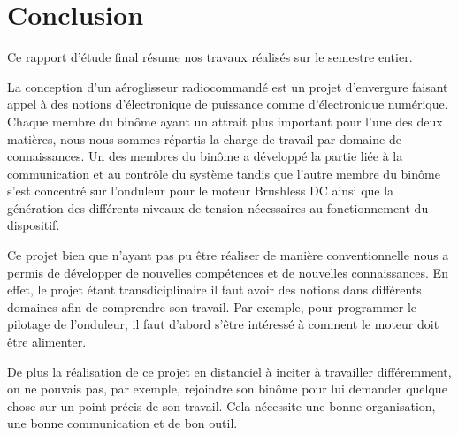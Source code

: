 	\chapter{Conclusion}
	
	Ce rapport d'étude final résume nos travaux réalisés sur le semestre entier.
	
	La conception d'un aéroglisseur radiocommandé est un projet d'envergure faisant appel à des notions d'électronique de puissance comme d'électronique numérique. Chaque membre du binôme ayant un attrait plus important pour l'une des deux matières, nous nous sommes répartis la charge de travail par domaine de connaissances. Un des membres du binôme a développé la partie liée à la communication et au contrôle du système tandis que l'autre membre du binôme s'est concentré sur l'onduleur pour le moteur Brushless DC ainsi que la génération des différents niveaux de tension nécessaires au fonctionnement du dispositif.
	
	Ce projet bien que n'ayant pas pu être réaliser de manière conventionnelle nous a permis de développer de nouvelles compétences et de nouvelles connaissances. En effet, le projet étant transdiciplinaire il faut avoir des notions dans différents domaines afin de comprendre son travail. Par exemple, pour programmer le pilotage de l'onduleur, il faut d'abord s'être intéressé à comment le moteur doit être alimenter.
	
	De plus la réalisation de ce projet en distanciel à inciter à travailler différemment, on ne pouvais pas, par exemple, rejoindre son binôme pour lui demander quelque chose sur un point précis de son travail. Cela nécessite une bonne organisation, une bonne communication et de bon outil.
	

